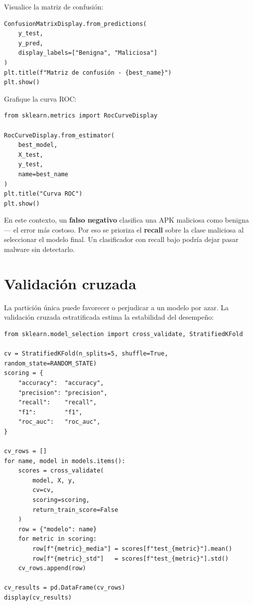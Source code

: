 \documentclass[
  coursetitle={Cómputo Nube y Tecnologías Emergentes},
  coursehours={96},
  coursedate={Verano 2026},
  doctype={Tutorial},
  otherlangs={english,french},
  authorname={Lázaro},
  authorsurname={Bustio-Martínez},
  authortitle={PhD},
  role={Profesor Investigador},
  email={lbustio@inaoe.mx},
  phone={5559504000},
  ext={7459},
  institution={Instituto Nacional de Astrofísica, Óptica y Electrónica (INAOE)},
  department={Maestría en Ciencias en Tecnologías de Seguridad},
  address={Luis Enrique Erro 1, Sta. Ma. Tonantzintla, San Andrés Cholula, CP 72840, Puebla, México},
  margin={0.5in}
]{../../lbustio_lecture_notes}
\begin{document}
Visualice la matriz de confusión:

\begin{lstlisting}
ConfusionMatrixDisplay.from_predictions(
    y_test,
    y_pred,
    display_labels=["Benigna", "Maliciosa"]
)
plt.title(f"Matriz de confusión - {best_name}")
plt.show()
\end{lstlisting}

Grafique la curva ROC:

\begin{lstlisting}
from sklearn.metrics import RocCurveDisplay

RocCurveDisplay.from_estimator(
    best_model,
    X_test,
    y_test,
    name=best_name
)
plt.title("Curva ROC")
plt.show()
\end{lstlisting}

\begin{tcolorbox}[title=Falsos negativos en seguridad]
En este contexto, un \textbf{falso negativo} clasifica una APK maliciosa como benigna --- el error más costoso. Por eso se prioriza el \textbf{recall} sobre la clase maliciosa al seleccionar el modelo final. Un clasificador con recall bajo podría dejar pasar malware sin detectarlo.
\end{tcolorbox}

\section{Validación cruzada}

La partición única puede favorecer o perjudicar a un modelo por azar. La validación cruzada estratificada estima la estabilidad del desempeño:

\begin{lstlisting}
from sklearn.model_selection import cross_validate, StratifiedKFold

cv = StratifiedKFold(n_splits=5, shuffle=True, random_state=RANDOM_STATE)
scoring = {
    "accuracy":  "accuracy",
    "precision": "precision",
    "recall":    "recall",
    "f1":        "f1",
    "roc_auc":   "roc_auc",
}

cv_rows = []
for name, model in models.items():
    scores = cross_validate(
        model, X, y,
        cv=cv,
        scoring=scoring,
        return_train_score=False
    )
    row = {"modelo": name}
    for metric in scoring:
        row[f"{metric}_media"] = scores[f"test_{metric}"].mean()
        row[f"{metric}_std"]   = scores[f"test_{metric}"].std()
    cv_rows.append(row)

cv_results = pd.DataFrame(cv_rows)
display(cv_results)
\end{lstlisting}
\end{document}
